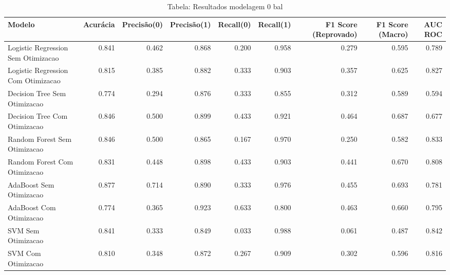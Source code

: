 \begin{table}[H] %
    \centering
    \caption{Tabela: Resultados modelagem 0 bal}
    \label{tab:resultados_modelagem_0_bal}
    \renewcommand{\arraystretch}{1.25} %
    \begin{adjustwidth}{ -1in }{ -1in } %
    \centering %
    \small %
    \begin{tabular}{lrrrrrrrr}
\toprule
                            Modelo &  Acurácia &  Precisão(0) &  Precisão(1) &  Recall(0) &  Recall(1) &  F1 Score (Reprovado) &  F1 Score (Macro) &  AUC ROC \\
\midrule
Logistic Regression Sem Otimizacao &     0.841 &        0.462 &        0.868 &      0.200 &      0.958 &                 0.279 &             0.595 &    0.789 \\
Logistic Regression Com Otimizacao &     0.815 &        0.385 &        0.882 &      0.333 &      0.903 &                 0.357 &             0.625 &    0.827 \\
      Decision Tree Sem Otimizacao &     0.774 &        0.294 &        0.876 &      0.333 &      0.855 &                 0.312 &             0.589 &    0.594 \\
      Decision Tree Com Otimizacao &     0.846 &        0.500 &        0.899 &      0.433 &      0.921 &                 0.464 &             0.687 &    0.677 \\
      Random Forest Sem Otimizacao &     0.846 &        0.500 &        0.865 &      0.167 &      0.970 &                 0.250 &             0.582 &    0.833 \\
      Random Forest Com Otimizacao &     0.831 &        0.448 &        0.898 &      0.433 &      0.903 &                 0.441 &             0.670 &    0.808 \\
           AdaBoost Sem Otimizacao &     0.877 &        0.714 &        0.890 &      0.333 &      0.976 &                 0.455 &             0.693 &    0.781 \\
           AdaBoost Com Otimizacao &     0.774 &        0.365 &        0.923 &      0.633 &      0.800 &                 0.463 &             0.660 &    0.795 \\
                SVM Sem Otimizacao &     0.841 &        0.333 &        0.849 &      0.033 &      0.988 &                 0.061 &             0.487 &    0.842 \\
                SVM Com Otimizacao &     0.810 &        0.348 &        0.872 &      0.267 &      0.909 &                 0.302 &             0.596 &    0.816 \\
\bottomrule
\end{tabular}
    \end{adjustwidth}
    \renewcommand{\arraystretch}{1.0} %
\end{table}
